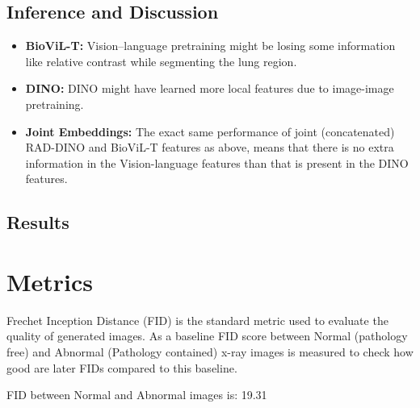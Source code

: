 \subsection{Inference and Discussion}
\begin{itemize}

  \item \textbf{BioViL-T:} Vision--language pretraining might be losing some information like relative contrast 
  while segmenting the lung region.

  \item \textbf{DINO:} DINO might have learned more local features due to image-image pretraining. 

  \item \textbf{Joint Embeddings:} The exact same performance of joint (concatenated) RAD-DINO and BioViL-T features as above, means that 
  there is no extra information in the Vision-language features than that is present in the DINO features.

\end{itemize}

\subsection{Results}


\section{Metrics}
Frechet Inception Distance (FID) is the standard metric used to evaluate the quality of generated images. 
As a baseline FID score between Normal (pathology free) and Abnormal (Pathology contained) x-ray images is 
measured to check how good are later FIDs compared to this baseline.

FID between Normal and Abnormal images is: 19.31


